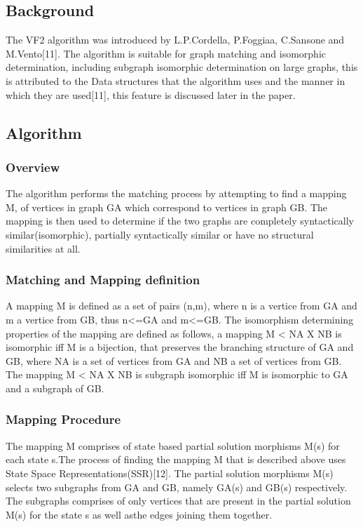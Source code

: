 \label{VF2 Algorithm}

\subsection{Background}
 The VF2 algorithm was introduced by L.P.Cordella, P.Foggiaa, C.Sansone and M.Vento[11]. The algorithm is suitable for graph matching and isomorphic determination, including subgraph isomorphic determination on large graphs, this is attributed to the Data structures that the algorithm uses and the manner in which they are used[11], this feature is discussed later in the paper.

\subsection{Algorithm}
\subsubsection{Overview}
The algorithm performs the matching process by attempting to find a mapping M, of vertices in graph G{\tiny A} which correspond to vertices in graph G{\tiny B}. The mapping is then used to determine if the two graphs are completely syntactically similar(isomorphic), partially syntactically similar or have no structural similarities at all.
\subsubsection{Matching and Mapping definition}
A mapping M is defined as a set of pairs (n,m), where n is a vertice from G{\tiny A} and m a vertice from G{\tiny B}, thus n<=G{\tiny A} and m<=G{\tiny B}.
The isomorphism determining properties of the mapping are defined as follows, a mapping M < NA X NB is isomorphic iff M is a bijection, that preserves the branching structure of G{\tiny A} and G{\tiny B}, where NA is a set of vertices from G{\tiny A} and NB a set of vertices from G{\tiny B}.\newline\newline
The mapping M < NA X NB is subgraph isomorphic iff M is isomorphic to G{\tiny A} and a subgraph of G{\tiny B}.

\subsubsection{Mapping Procedure}
The mapping M comprises of state based partial solution morphisms M(s) for each state s.The process of finding the mapping M that is described above uses State Space Representations(SSR)[12].
The partial solution morphisms M(s) selects two subgraphs from G{\tiny A} and G{\tiny B}, namely G{\tiny A}(s) and G{\tiny B}(s) respectively. The subgraphs comprises of only vertices that are present in the partial solution M(s) for the state s as well asthe edges joining them together.\newline\newline

